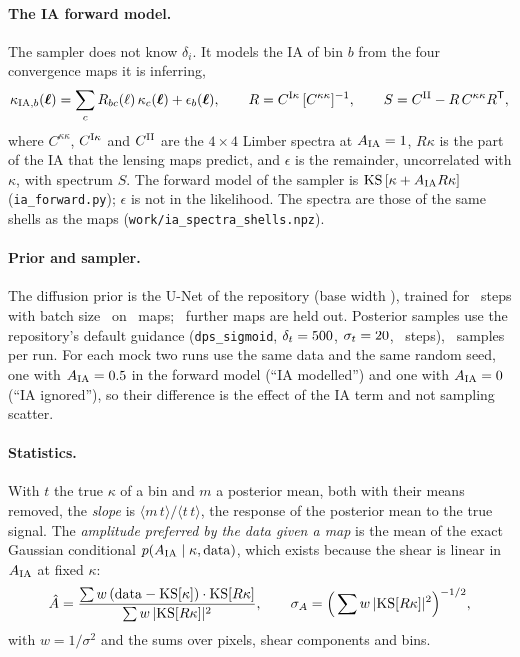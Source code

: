 \documentclass[11pt]{article}
\newcommand{\T}{^{\mathsf{T}}}
\newcommand{\AIA}{A_{\rm IA}}
\newcommand{\Ckk}{C^{\kappa\kappa}}
\newcommand{\CIk}{C^{{\rm I}\kappa}}
\newcommand{\CII}{C^{\rm II}}
\begin{document}
\paragraph{The IA forward model.}
The sampler does not know $\delta_i$. It models the IA of bin $b$ from the four convergence
maps it is inferring,
\begin{equation}
  \kappa_{{\rm IA},b}(\boldsymbol\ell) = \sum_c R_{bc}(\ell)\,\kappa_c(\boldsymbol\ell) + \epsilon_b(\boldsymbol\ell),
  \qquad R = \CIk\,[\Ckk]^{-1}, \qquad S = \CII - R\,\Ckk R\T ,
  \label{eq:model}
\end{equation}
where $\Ckk$, $\CIk$ and $\CII$ are the $4 \times 4$ Limber spectra at $\AIA = 1$, $R\kappa$ is
the part of the IA that the lensing maps predict, and $\epsilon$ is the remainder, uncorrelated
with $\kappa$, with spectrum $S$. The forward model of the sampler is
${\rm KS}\left[\kappa + \AIA R\kappa\right]$ (\texttt{ia\_forward.py}); $\epsilon$ is not in the
likelihood. The spectra are those of the same shells as the maps
(\texttt{work/ia\_spectra\_shells.npz}).

\paragraph{Prior and sampler.}
The diffusion prior is the U-Net of the repository (base width \UnetWidth), trained for \TrainSteps\ steps
with batch size \TrainBatch\ on \NTrain\ maps; \NTest\ further maps are held out. Posterior samples use
the repository's default guidance (\texttt{dps\_sigmoid}, $\delta_t = 500$, $\sigma_t = 20$,
\SampleSteps\ steps), \NSamples\ samples per run. For each mock two runs use the same data and the same random seed, one with
$\AIA = \AInjected$ in the forward model (``IA modelled'') and one with $\AIA = 0$ (``IA
ignored''), so their difference is the effect of the IA term and not sampling scatter.

\paragraph{Statistics.}
With $t$ the true $\kappa$ of a bin and $m$ a posterior mean, both with their means removed,
the \emph{slope} is $\langle m\,t\rangle / \langle t\,t\rangle$, the response of the posterior
mean to the true signal. The \emph{amplitude preferred by the data given a map} is the mean of
the exact Gaussian conditional $p(\AIA \mid \kappa, {\rm data})$, which exists because the shear
is linear in $\AIA$ at fixed $\kappa$:
\begin{equation}
  \hat A = \frac{\sum w\,({\rm data} - {\rm KS}[\kappa]) \cdot {\rm KS}[R\kappa]}
                {\sum w\,|{\rm KS}[R\kappa]|^2},
  \qquad \sigma_A = \Big(\sum w\,|{\rm KS}[R\kappa]|^2\Big)^{-1/2},
  \label{eq:amp}
\end{equation}
with $w = 1/\sigma^2$ and the sums over pixels, shear components and bins.
\end{document}
